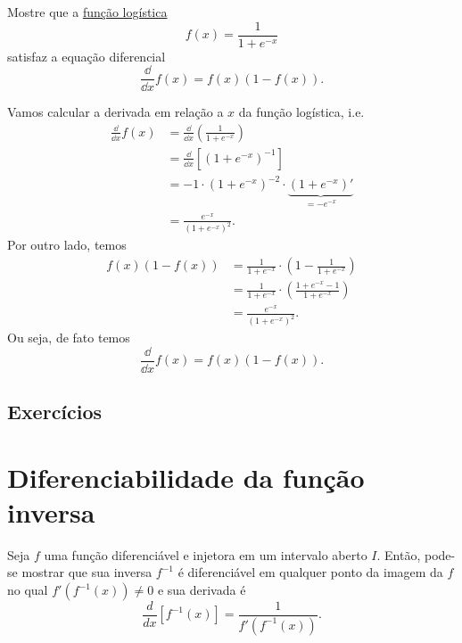 \begin{exeresol}
  Mostre que a \href{https://pt.wikipedia.org/wiki/Fun%C3%A7%C3%A3o_log%C3%ADstica}{função logística}
  \begin{equation}
    f(x) = \frac{1}{1+e^{-x}}
  \end{equation}
  satisfaz a equação diferencial
  \begin{equation}
    \frac{\dd}{\dd x}f(x) = f(x)(1-f(x)).
  \end{equation}
\end{exeresol}
\begin{resol}
  Vamos calcular a derivada em relação a $x$ da função logística, i.e.
  \begin{align}
    \frac{\dd}{\dd x}f(x) &= \frac{\dd}{\dd x}\left(\frac{1}{1+e^{-x}}\right) \\
          &= \frac{\dd}{\dd x}\left[\left(1+e^{-x}\right)^{-1}\right] \\
          &= -1\cdot\left(1+e^{-x}\right)^{-2}\cdot\underbrace{\left(1+e^{-x}\right)'}_{=-e^{-x}} \\
          &= \frac{e^{-x}}{\left(1+e^{-x}\right)^{2}}.
  \end{align}
  Por outro lado, temos
  \begin{align}
    f(x)(1-f(x)) &= \frac{1}{1+e^{-x}}\cdot\left(1 - \frac{1}{1+e^{-x}}\right) \\
                 &= \frac{1}{1+e^{-x}}\cdot\left(\frac{1+e^{-x}-1}{1+e^{-x}}\right) \\
                 &= \frac{e^{-x}}{\left(1+e^{-x}\right)^{2}}.
  \end{align}
  Ou seja, de fato temos
  \begin{equation}
    \frac{\dd}{\dd x}f(x) = f(x)(1-f(x)).
  \end{equation}  
\end{resol}

\subsection*{Exercícios}

\emconstrucao

\section{Diferenciabilidade da função inversa}\label{cap_deriv_sec_funinv}

Seja $f$ uma função diferenciável e injetora em um intervalo aberto $I$. Então, pode-se mostrar que sua inversa $f^{-1}$ é diferenciável em qualquer ponto da imagem da $f$ no qual $f'(f^{-1}(x))\neq 0$ e sua derivada é
\begin{equation}\label{eq:diff_funinv}
  \frac{d}{dx}[f^{-1}(x)] = \frac{1}{f'(f^{-1}(x))}.
\end{equation}

